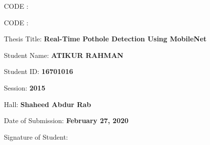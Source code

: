 \clearpage
{}
\begin{titlepage}
    \linespread{1.25}
    \begin{large}
    \begin{minipage}[t][\textheight][t]{0.38\textwidth}
        CODE :
    \end{minipage}
    \hfill \vrule \hfill
    \hspace*{0.02\textwidth}
    \begin{minipage}[t][\textheight][t]{0.52\textwidth}
        CODE : 
        
        \vfill\raggedright
        Thesis Title: {\Large\textbf{Real-Time Pothole Detection Using MobileNet}}
        
        \vfill
        Student Name: \textbf{ATIKUR RAHMAN}
        
        \vspace{5mm}
        Student ID: \textbf{16701016}
        
        \vspace{5mm}
        Session: \textbf{2015}
        
        \vspace{5mm}
        Hall: \textbf{Shaheed Abdur Rab}
        
        \vspace{5mm}
        Date of Submission: \textbf{February 27, 2020}
        
        \vspace{5mm}
        Signature of Student:
        
        \vspace{1cm}
        \makebox[\linewidth]{\dotfill}
    \end{minipage}
    \end{large}
\end{titlepage}
\restoregeometry
